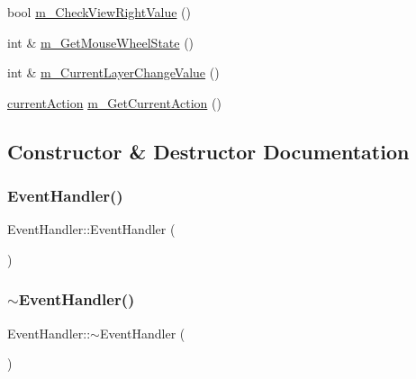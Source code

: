 \begin{DoxyCompactItemize}
\item 
bool \mbox{\hyperlink{class_event_handler_ad6ed2afa051f91ac622f3c9bfff862ef}{m\+\_\+\+Check\+View\+Right\+Value}} ()
\item 
int \& \mbox{\hyperlink{class_event_handler_accb8a32ae3f165b2ac42d313df0e9425}{m\+\_\+\+Get\+Mouse\+Wheel\+State}} ()
\item 
int \& \mbox{\hyperlink{class_event_handler_ae092797c27fa0815b960f61a19ad2426}{m\+\_\+\+Current\+Layer\+Change\+Value}} ()
\item 
\mbox{\hyperlink{defs_8h_ac4f8c89b962f2fa93febb5519cc2b4dc}{current\+Action}} \mbox{\hyperlink{class_event_handler_a9a6a8664627cc85525e058280358753b}{m\+\_\+\+Get\+Current\+Action}} ()
\end{DoxyCompactItemize}


\subsection{Constructor \& Destructor Documentation}
\mbox{\label{class_event_handler_a8fe27b69582cce5c6a89a0b134bc8158}} 
\subsubsection{\texorpdfstring{Event\+Handler()}{EventHandler()}}
{\footnotesize\ttfamily Event\+Handler\+::\+Event\+Handler (\begin{DoxyParamCaption}{ }\end{DoxyParamCaption})}

\mbox{\label{class_event_handler_a3decb8cd88ba8af2b9b0b0f0f2fcd722}} 
\subsubsection{\texorpdfstring{$\sim$\+Event\+Handler()}{~EventHandler()}}
{\footnotesize\ttfamily Event\+Handler\+::$\sim$\+Event\+Handler (\begin{DoxyParamCaption}{ }\end{DoxyParamCaption})}



